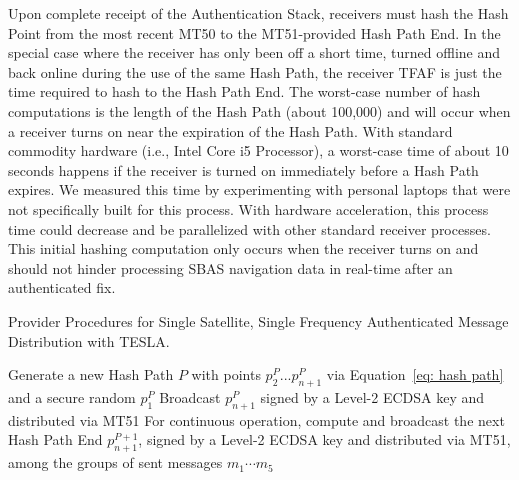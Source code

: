 \documentclass[letterpaper,times]{IONconf/IONconf}
\begin{document}
		Upon complete receipt of the Authentication Stack, receivers must hash the Hash Point from the most recent MT50 to the MT51-provided Hash Path End.
		In the special case where the receiver has only been off a short time, turned offline and back online during the use of the same Hash Path, the receiver TFAF is just the time required to hash to the Hash Path End.
		The worst-case number of hash computations is the length of the Hash Path (about 100,000) and will occur when a receiver turns on near the expiration of the Hash Path.
		With standard commodity hardware (i.e., Intel Core i5 Processor), a worst-case time of about 10 seconds happens if the receiver is turned on immediately before a Hash Path expires.
		We measured this time by experimenting with personal laptops that were not specifically built for this process.
		With hardware acceleration, this process time could decrease and be parallelized with other standard receiver processes.
		This initial hashing computation only occurs when the receiver turns on and should not hinder processing SBAS navigation data in real-time after an authenticated fix.

		\begin{algorithm}%
			\caption{Provider Procedures for Single Satellite, Single Frequency Authenticated Message Distribution with TESLA.}
			\label{alg: TESLA provider}
			\SetAlgoLined
			Generate a new Hash Path $P$ with points $p^P_2 ... p^P_{n+1}$ via Equation~\eqref{eq: hash path} and a secure random $p^P_1$\;
			Broadcast $p^P_{n+1}$ signed by a Level-2 ECDSA key and distributed via MT51\;
			For continuous operation, compute and broadcast the next Hash Path End $p^{P+1}_{n+1}$, signed by a Level-2 ECDSA key and distributed via MT51, among the groups of sent messages $m_1 \cdots m_5$\;
		\end{algorithm}
\end{document}
